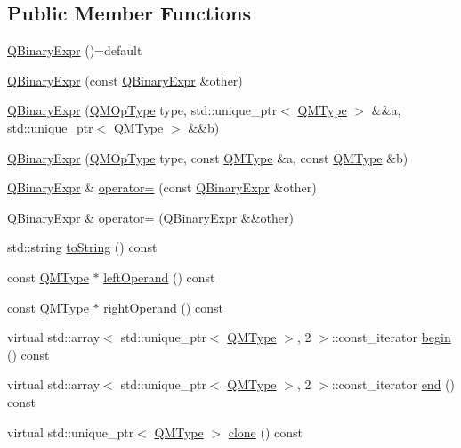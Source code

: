 \subsection*{Public Member Functions}
\begin{DoxyCompactItemize}
\item 
\hyperlink{classQuickMath_1_1QBinaryExpr_ae3e8ea0c221e7638af664ca6ce1f73bb}{Q\+Binary\+Expr} ()=default
\item 
\hyperlink{classQuickMath_1_1QBinaryExpr_a7d82ba57de6234fefe3becafa1537b80}{Q\+Binary\+Expr} (const \hyperlink{classQuickMath_1_1QBinaryExpr}{Q\+Binary\+Expr} \&other)
\item 
\hyperlink{classQuickMath_1_1QBinaryExpr_ad7bef4aa782a97b2a42e368dba19ed12}{Q\+Binary\+Expr} (\hyperlink{namespaceQuickMath_a0a6c67b9dab0cfd5f3e711b0573545cb}{Q\+M\+Op\+Type} type, std\+::unique\+\_\+ptr$<$ \hyperlink{classQuickMath_1_1QMType}{Q\+M\+Type} $>$ \&\&a, std\+::unique\+\_\+ptr$<$ \hyperlink{classQuickMath_1_1QMType}{Q\+M\+Type} $>$ \&\&b)
\item 
\hyperlink{classQuickMath_1_1QBinaryExpr_acd2a34c2332a67f3e00e56ab12b6e50f}{Q\+Binary\+Expr} (\hyperlink{namespaceQuickMath_a0a6c67b9dab0cfd5f3e711b0573545cb}{Q\+M\+Op\+Type} type, const \hyperlink{classQuickMath_1_1QMType}{Q\+M\+Type} \&a, const \hyperlink{classQuickMath_1_1QMType}{Q\+M\+Type} \&b)
\item 
\hyperlink{classQuickMath_1_1QBinaryExpr}{Q\+Binary\+Expr} \& \hyperlink{classQuickMath_1_1QBinaryExpr_a78895218c64c48c434bed0e80e732bcc}{operator=} (const \hyperlink{classQuickMath_1_1QBinaryExpr}{Q\+Binary\+Expr} \&other)
\item 
\hyperlink{classQuickMath_1_1QBinaryExpr}{Q\+Binary\+Expr} \& \hyperlink{classQuickMath_1_1QBinaryExpr_a0bc73ff4a6cd65d152c80a2259b4288b}{operator=} (\hyperlink{classQuickMath_1_1QBinaryExpr}{Q\+Binary\+Expr} \&\&other)
\item 
std\+::string \hyperlink{classQuickMath_1_1QBinaryExpr_ac253a522b55817ceeff36229d976dc79}{to\+String} () const 
\item 
const \hyperlink{classQuickMath_1_1QMType}{Q\+M\+Type} $\ast$ \hyperlink{classQuickMath_1_1QBinaryExpr_a89a08e6e8e83a664faafcb0ff984c94d}{left\+Operand} () const 
\item 
const \hyperlink{classQuickMath_1_1QMType}{Q\+M\+Type} $\ast$ \hyperlink{classQuickMath_1_1QBinaryExpr_a08d4732282c676dc8a57ee3bd2260a04}{right\+Operand} () const 
\item 
virtual std\+::array$<$ std\+::unique\+\_\+ptr$<$ \hyperlink{classQuickMath_1_1QMType}{Q\+M\+Type} $>$, 2 $>$\+::const\+\_\+iterator \hyperlink{classQuickMath_1_1QBinaryExpr_a28625c412a7c22d5c1060fa9f3db7877}{begin} () const 
\item 
virtual std\+::array$<$ std\+::unique\+\_\+ptr$<$ \hyperlink{classQuickMath_1_1QMType}{Q\+M\+Type} $>$, 2 $>$\+::const\+\_\+iterator \hyperlink{classQuickMath_1_1QBinaryExpr_a14f50114683fddb39cf74f2e82805672}{end} () const 
\item 
virtual std\+::unique\+\_\+ptr$<$ \hyperlink{classQuickMath_1_1QMType}{Q\+M\+Type} $>$ \hyperlink{classQuickMath_1_1QBinaryExpr_a1a13bf258ab921b56b63914b40a07909}{clone} () const 
\end{DoxyCompactItemize}
